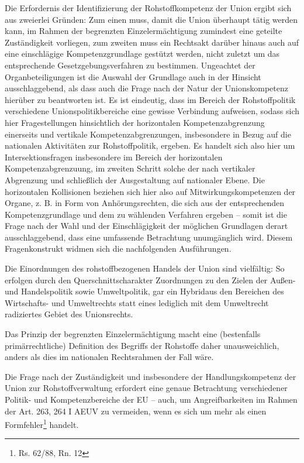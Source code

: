 \documentclass[12pt,a4paper,oneside]{book} %
\begin{document}
Die Erfordernis der Identifizierung der Rohstoffkompetenz der Union ergibt sich aus zweierlei Gründen: Zum einen muss, damit die Union überhaupt tätig werden kann, im Rahmen der begrenzten Einzelermächtigung zumindest eine geteilte Zuständigkeit vorliegen, zum zweiten muss ein Rechtsakt darüber hinaus auch auf eine einschlägige Kompetenzgrundlage gestützt werden, nicht zuletzt um das entsprechende Gesetzgebungsverfahren zu bestimmen. Ungeachtet der Organbeteiligungen ist die Auswahl der Grundlage auch in der Hinsicht ausschlaggebend, als dass auch die Frage nach der Natur der Unionskompetenz hierüber zu beantworten ist. Es ist eindeutig, dass im Bereich der Rohstoffpolitik verschiedene Unionspolitikbereiche eine gewisse Verbindung aufweisen, sodass sich hier Fragestellungen hinsichtlich der horizontalen Kompetenzabgrenzung einerseits und vertikale Kompetenzabgrenzungen, insbesondere in Bezug auf die nationalen Aktivitäten zur Rohstoffpolitik, ergeben. Es handelt sich also hier um Intersektionsfragen insbesondere im Bereich der horizontalen Kompetenzabgrenzuung, im zweiten Schritt solche der nach vertikaler Abgrenzung und schließlich der Ausgestaltung auf nationaler Ebene. Die horizontalen Kollisionen beziehen sich hier also auf Mitwirkungskompetenzen der Organe, z. B. in Form von Anhörungsrechten, die sich aus der entsprechenden Kompetenzgrundlage und dem zu wählenden Verfahren ergeben -- somit ist die Frage nach der Wahl und der Einschlägigkeit der möglichen Grundlagen derart ausschlaggebend, dass eine umfassende Betrachtung unumgänglich wird. Diesem Fragenkonstrukt widmen sich die nachfolgenden Ausführungen.

Die Einordnungen des rohstoffbezogenen Handels der Union sind vielfältig: So erfolgen durch den Querschnittscharakter Zuordnungen zu den Zielen der Außen- und Handelspolitik sowie Umweltpolitik\autocite[7]{Kueblboeck_2023}, gar ein \glqq Hybrid\grqq aus den Bereichen des Wirtschafts- und Umweltrechts statt eines lediglich mit dem Umweltrecht \glqq radiziertes Gebiet des Unionsrechts\grqq.\autocite{terhechte_konoslidierung_emergenz_2015}

Das Prinzip der begrenzten Einzelermächtigung macht eine (bestenfalls primärrechtliche) Definition des Begriffs der Rohstoffe daher unausweichlich, anders als dies im nationalen Rechtsrahmen der Fall wäre.
	
Die Frage nach der Zuständigkeit und insbesondere der Handlungskompetenz der Union zur Rohstoffverwaltung erfordert eine genaue Betrachtung verschiedener Politik- und Kompetenzbereiche der EU -- auch, um Angreifbarkeiten im Rahmen der Art. 263, 264 I AEUV zu vermeiden, wenn es sich um mehr als einen \glqq Formfehler\grqq\footnote{Rs. 62/88, Rn. 12} handelt.
	
\end{document}
